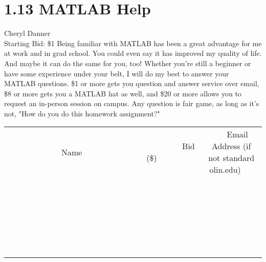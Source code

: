 \documentclass[11pt]{article}
\begin{document}
\section*{1.13 MATLAB Help}
Cheryl Danner
\\
Starting Bid: \$1
\newline
Being familiar with MATLAB has been a great advantage for me at work and in grad school. You could even say it has improved my quality of life. And maybe it can do the same for you, too! Whether you're still a beginner or have some experience under your belt, I will do my best to answer your MATLAB questions. \$1 or more gets you question and answer service over email, \$8 or more gets you a MATLAB hat as well, and \$20 or more allows you to request an in-person session on campus. Any question is fair game, as long as it's not, "How do you do this homework assignment?"
\\[6ex]
\begin{tabular}{c c c}
~~~~~~~~~~~~~Name~~~~~~~~~~~~~ & ~~~~~~~~~Bid (\$)~~~~~~~~~  & ~~~Email Address (if not standard olin.edu)~~~\\
 & & \\
\hline
 & & \\
\hline
 & & \\
\hline
 & & \\
\hline
 & & \\
\hline
 & & \\
\hline
 & & \\
\hline
 & & \\
\hline
 & & \\
\hline
 & & \\
\hline
 & & \\
\hline
 & & \\
\hline
 & & \\
\hline
 & & \\
\hline
 & & \\
\hline
 & & \\
\hline
 & & \\
\hline
 & & \\
\hline
 & & \\
\hline
 & & \\
\hline
 & & \\
\hline
 & & \\
\hline
 & & \\
\hline
 & & \\
\hline
 & & \\
\hline
 & & \\
\hline
\end{tabular}
\newpage
\end{document}
